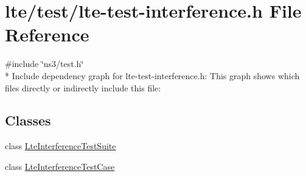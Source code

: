 \hypertarget{lte-test-interference_8h}{}\section{lte/test/lte-\/test-\/interference.h File Reference}
\label{lte-test-interference_8h}
{\ttfamily \#include \char`\"{}ns3/test.\+h\char`\"{}}\\*
Include dependency graph for lte-\/test-\/interference.h\+:
This graph shows which files directly or indirectly include this file\+:
\subsection*{Classes}
\begin{DoxyCompactItemize}
\item 
class \hyperlink{classLteInterferenceTestSuite}{Lte\+Interference\+Test\+Suite}
\item 
class \hyperlink{classLteInterferenceTestCase}{Lte\+Interference\+Test\+Case}
\end{DoxyCompactItemize}
